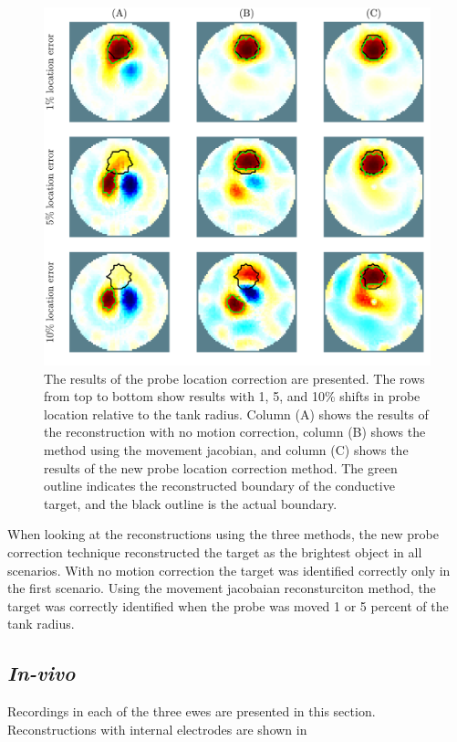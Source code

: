 \begin{figure}
    \centering
	\includegraphics[width=\textwidth]{chapter7-internal_elec_motion/imgs/recon_accuracy_hollow.pdf} 
	\caption[Results of the probe location correction]{\label{fig:probe_location_correction} 
	The results of the probe location correction are presented. 
	The rows from top to bottom show results with 1, 5, and 10\% shifts in probe location 
	relative to the tank radius.
	Column (A) shows the results of the reconstruction  with no motion correction,
	column (B) shows the method using the movement jacobian, and 
	column (C) shows the results of the new probe location correction method.
	The green outline indicates the reconstructed boundary of the conductive target, 
	and the black outline is the actual boundary.}
\end{figure}

When looking at the reconstructions using the three methods, the new probe correction technique
reconstructed the target as the brightest object in all scenarios. With no motion correction the 
target was identified correctly only in the first scenario. Using the movement jacobaian 
reconsturciton method, the target was correctly identified when the probe was moved 1 or 5 percent
of the tank radius. 

\subsection{\emph{In-vivo}}
Recordings in each of the three ewes are presented in this section.
Reconstructions with internal electrodes are shown in

